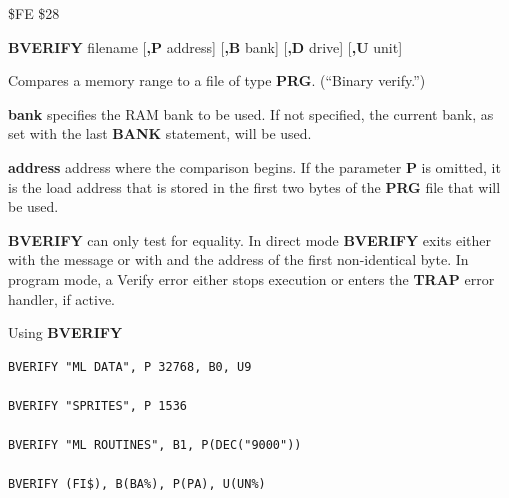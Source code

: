 \begin{description}[leftmargin=2cm,style=nextline]
\item [Token:]    \$FE \$28

\item [Format:]   {\bf BVERIFY} filename [{\bf,P} address] [{\bf,B} bank] [{\bf,D} drive] [{\bf,U} unit]

\item [Usage:]    Compares a memory range to a file of type {\bf PRG}. (``Binary verify.'')

                  \filenamedefinition

                  {\bf bank} specifies the RAM bank to be used. If not specified, the current bank, as set with the last {\bf BANK} statement, will be used.

                  {\bf address} address where the comparison begins. If the parameter {\bf P} is omitted, it is the load address that is stored in the first two bytes of the {\bf PRG} file that will be used.

                  \drivedefinition

                  \unitdefinition

\item [Remarks:]  {\bf BVERIFY} can only test for equality. In direct mode {\bf BVERIFY} exits either with the message  or with  and the address of the first non-identical byte. In program mode, a Verify error either stops execution or enters the {\bf TRAP} error handler, if active.

\item [Examples:] Using {\bf BVERIFY}

\begin{tcolorbox}[colback=black,coltext=white]
\verbatimfont{\codefont}
\begin{verbatim}
BVERIFY "ML DATA", P 32768, B0, U9

BVERIFY "SPRITES", P 1536

BVERIFY "ML ROUTINES", B1, P(DEC("9000"))

BVERIFY (FI$), B(BA%), P(PA), U(UN%)
\end{verbatim}
\end{tcolorbox}
\end{description}


\newpage
